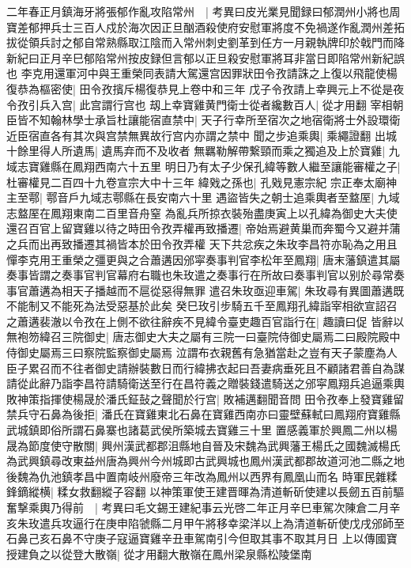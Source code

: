 二年春正月鎮海牙將張郁作亂攻陷常州　|{
	考異曰皮光業見聞録曰郁潤州小將也周寶差郁押兵士三百人戍於海次因正旦酗酒殺使府安慰軍將度不免禍遂作亂潤州差拓拔從領兵討之郁自常熟縣取江陰而入常州刺史劉革到任方一月親執牌印於戟門而降新紀曰正月辛巳郁陷常州按皮録但言郁以正旦殺安慰軍將耳非當日即陷常州新紀誤也}
李克用還軍河中與王重榮同表請大駕還宫因罪狀田令孜請誅之上復以飛龍使楊復恭為樞密使|{
	田令孜擯斥楊復恭見上卷中和三年}
戊子令孜請上幸興元上不從是夜令孜引兵入宫|{
	此宫謂行宫也}
刼上幸寶雞黄門衛士從者纔數百人|{
	從才用翻}
宰相朝臣皆不知翰林學士承旨杜讓能宿直禁中|{
	天子行幸所至宿次之地宿衛將士外設環衛近臣宿直各有其次與宫禁無異故行宫内亦謂之禁中}
聞之步追乘輿|{
	乘繩證翻}
出城十餘里得人所遺馬|{
	遺馬弃而不及收者}
無羈勒解帶繋頸而乘之獨追及上於寶雞|{
	九域志寶雞縣在鳳翔西南六十五里}
明日乃有太子少保孔緯等數人繼至讓能審權之子|{
	杜審權見二百四十九卷宣宗大中十三年}
緯戣之孫也|{
	孔戣見憲宗紀}
宗正奉太廟神主至鄠|{
	鄠音戶九域志鄠縣在長安南六十里}
遇盜皆失之朝士追乘輿者至盩厔|{
	九域志盩厔在鳳翔東南二百里音舟窒}
為亂兵所掠衣裝殆盡庚寅上以孔緯為御史大夫使還召百官上留寶雞以待之時田令孜弄權再致播遷|{
	帝始焉避黄巢而奔蜀今又避并蒲之兵而出再致播遷其禍皆本於田令孜弄權}
天下共忿疾之朱玫李昌符亦恥為之用且憚李克用王重榮之彊更與之合蕭遘因邠寜奏事判官李松年至鳳翔|{
	唐末藩鎮遣其屬奏事皆謂之奏事官判官幕府右職也朱玫遣之奏事行在所故曰奏事判官以别於尋常奏事官蕭遘為相天子播越而不扈從惡得無罪}
遣召朱玫亟迎車駕|{
	朱玫尋有異圖蕭遘既不能制又不能死為法受惡基於此矣}
癸巳玫引步騎五千至鳳翔孔緯詣宰相欲宣詔召之蕭遘裴澈以令孜在上側不欲往辭疾不見緯令臺吏趣百官詣行在|{
	趣讀曰促}
皆辭以無袍笏緯召三院御史|{
	唐志御史大夫之屬有三院一曰臺院侍御史屬焉二曰殿院殿中侍御史屬焉三曰察院監察御史屬焉}
泣謂布衣親舊有急猶當赴之豈有天子蒙塵為人臣子累召而不往者御史請辦裝數日而行緯拂衣起曰吾妻病垂死且不顧諸君善自為謀請從此辭乃詣李昌符請騎衛送至行在昌符義之贈裝錢遣騎送之邠寜鳳翔兵追逼乘輿敗神策指揮使楊晟於潘氏鉦鼔之聲聞於行宫|{
	敗補邁翻聞音問}
田令孜奉上發寶雞留禁兵守石鼻為後拒|{
	潘氏在寶雞東北石鼻在寶雞西南亦曰靈壁蘇軾曰鳳翔府寶雞縣武城鎮即俗所謂石鼻寨也諸葛武侯所築城去寶雞三十里}
置感義軍於興鳳二州以楊晟為節度使守散關|{
	興州漢武都郡沮縣地自晉及宋魏為武興藩王楊氏之國魏滅楊氏為武興鎮尋改東益州唐為興州今州城即古武興城也鳳州漢武都郡故道河池二縣之地後魏為仇池鎮孝昌中置南岐州廢帝三年改為鳳州以西界有鳳凰山而名}
時軍民雜糅鋒鏑縱横|{
	糅女救翻縱子容翻}
以神策軍使王建晋暉為清道斬斫使建以長劒五百前驅奮撃乘輿乃得前　|{
	考異曰毛文錫王建紀事云光啓二年正月辛巳車駕次陳倉二月辛亥朱玫遣兵攻逼行在庚申陷虢縣二月甲午將移幸梁洋以上為清道斬斫使戊戌邠師至石鼻己亥石鼻不守庚子寇逼寶雞辛丑車駕南引今但取其事不取其月日}
上以傳國寶授建負之以從登大散嶺|{
	從才用翻大散嶺在鳳州梁泉縣松陵堡南}
